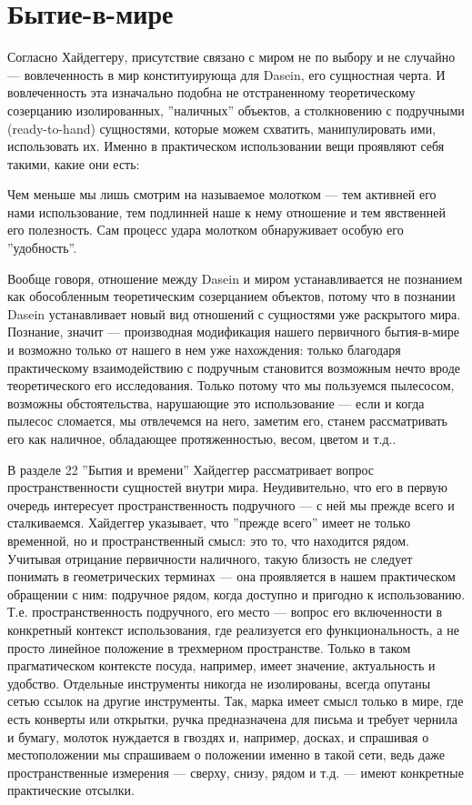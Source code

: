 \documentclass[11pt]{book}
\begin{document}
\section{Бытие-в-мире}

Согласно Хайдеггеру, присутствие связано с миром не по выбору и не случайно --- вовлеченность в мир конституирующа для Dasein, его сущностная черта. И вовлеченность эта изначально подобна не отстраненному теоретическому созерцанию изолированных, ''наличных'' объектов, а столкновению с подручными (ready-to-hand) сущностями, которые можем схватить, манипулировать ими, использовать их. Именно в практическом использовании вещи проявляют себя такими, какие они есть:

\smallskip
{}\relax
{}\relax

Чем меньше мы лишь смотрим на называемое молотком --- тем активней его нами использование, тем подлинней наше к нему отношение и тем явственней его полезность. Сам процесс удара молотком обнаруживает особую его ''удобность''.

\relax
{}\relax
\smallskip

Вообще говоря, отношение между Dasein и миром устанавливается не познанием как обособленным теоретическим созерцанием объектов, потому что в познании Dasein устанавливает новый вид отношений с сущностями уже раскрытого мира. Познание, значит --- производная модификация нашего первичного бытия-в-мире и возможно только от нашего в нем уже нахождения: только благодаря практическому взаимодействию с подручным становится возможным нечто вроде теоретического его исследования. Только потому что мы пользуемся пылесосом, возможны обстоятельства, нарушающие это использование --- если и когда пылесос сломается, мы отвлечемся на него, заметим его, станем рассматривать его как наличное, обладающее протяженностью, весом, цветом и т.д..

В разделе 22 ''Бытия и времени'' Хайдеггер рассматривает вопрос пространственности сущностей внутри мира. Неудивительно, что его в первую очередь интересует пространственность подручного --- с ней мы прежде всего и сталкиваемся. Хайдеггер указывает, что ''прежде всего'' имеет не только временной, но и пространственный смысл: это то, что находится рядом. Учитывая отрицание первичности наличного, такую близость не следует понимать в геометрических терминах --- она проявляется в нашем практическом обращении с ним: подручное рядом, когда доступно и пригодно к использованию. Т.е. пространственность подручного, его место --- вопрос его включенности в конкретный контекст использования, где реализуется его функциональность, а не просто линейное положение в трехмерном пространстве. Только в таком прагматическом контексте посуда, например, имеет значение, актуальность и удобство. Отдельные инструменты никогда не изолированы, всегда опутаны сетью ссылок на другие инструменты. Так, марка имеет смысл только в мире, где есть конверты или открытки, ручка предназначена для письма и требует чернила и бумагу, молоток нуждается в гвоздях и, например, досках, и спрашивая о местоположении мы спрашиваем о положении именно в такой сети, ведь даже пространственные измерения --- сверху, снизу, рядом и т.д. --- имеют конкретные практические отсылки.
\end{document}
